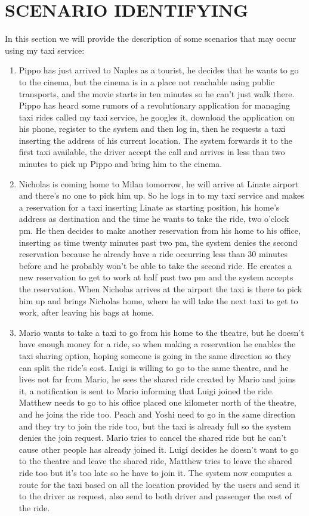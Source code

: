 
\section{SCENARIO IDENTIFYING}

In this section we will provide the description of some scenarios that may occur using my taxi service:
\begin{enumerate}
	\item Pippo has just arrived to Naples as a tourist, he decides that he wants to go to the cinema, but the cinema is in a place not reachable using public transports, and the movie starts in ten minutes so he can't just walk there. Pippo has heard some rumors of a revolutionary application for managing taxi rides called my taxi service, he googles it, download the application on his phone, register to the system and then log in, then he requests a taxi inserting the address of his current location. The system forwards it to the first taxi available, the driver accept the call and arrives in less than two minutes to pick up Pippo and bring him to the cinema.
	
	\item Nicholas is coming home to Milan tomorrow, he will arrive at Linate airport and there's no one to pick him up. So he logs in to my taxi service and makes a reservation for a taxi inserting Linate as starting position, his home's address as destination and the time he wants to take the ride, two o'clock pm. He then decides to make another reservation from his home to his office, inserting as time twenty minutes past two pm, the system denies the second reservation because he already have a ride occurring less than 30 minutes before and he probably won't be able to take the second ride. He creates a new reservation to get to work at half past two pm and the system accepts the reservation.
	When Nicholas arrives at the airport the taxi is there to pick him up and brings Nicholas home, where he will take the next taxi to get to work, after leaving his bags at home.
	
	\item Mario wants to take a taxi to go from his home to the theatre, but he doesn't have enough money for a ride, so when making a reservation he enables the taxi sharing option, hoping someone is going in the same direction so they can split the ride's cost. Luigi is willing to go to the same theatre, and he lives not far from Mario, he sees the shared ride created by Mario and joins it, a notification is sent to Mario informing that Luigi joined the ride. Matthew needs to go to his office placed one kilometer north of the theatre, and he joins the ride too. Peach and Yoshi need to go in the same direction and they try to join the ride too, but the taxi is already full so the system denies the join request. Mario tries to cancel the shared ride but he can't cause other people has already joined it. Luigi decides he doesn't want to go to the theatre and leave the shared ride, Matthew tries to leave the shared ride too but it's too late so he have to join it. The system now computes a route for the taxi based on all the location provided by the users and send it to the driver as request, also send to both driver and passenger the cost of the ride.
	

\end{enumerate}

